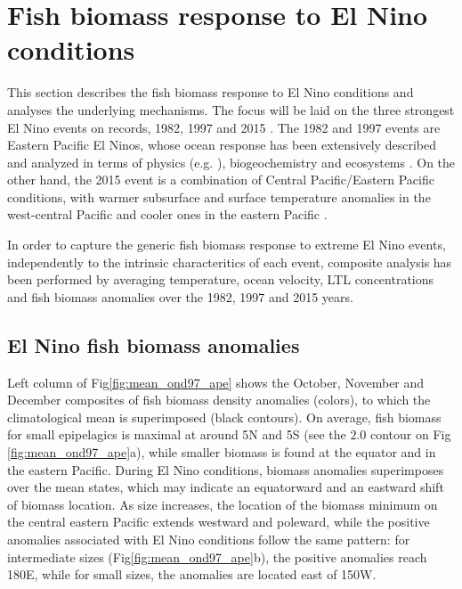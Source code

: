 \section{Fish biomass response to El Nino conditions}

This section describes the fish biomass response to El Nino conditions and analyses the underlying mechanisms. The focus will be laid on the three strongest El Nino events on records, 1982, 1997 and 2015 \citep{santosoDefiningCharacteristicsENSO2017}. The 1982 and 1997 events are Eastern Pacific El Ninos, whose ocean response has been extensively described and analyzed in terms of physics  (e.g. \citealt{mcphadenGenesisEvolution1997981999, vialardModelStudyOceanic2001, lengaigneOceanResponseMarch2002}), biogeochemistry \citep{chavezBiologicalChemicalResponse1999, gierachBiologicalResponse19972012} and ecosystems \citep{leaObservationsFishesAssociated2000, glynnCoralBleachingMortality2001,arcosJackMackerelFishery2001}. On the other hand, the 2015 event is a combination of Central Pacific/Eastern Pacific conditions, with warmer subsurface and surface temperature anomalies in the west-central Pacific and cooler ones in the eastern Pacific \citep{lheureuxObservingPredicting20152017}. 

In order to capture the generic fish biomass response to extreme El Nino events, independently to the intrinsic characteritics of each event, composite analysis has been performed by averaging temperature, ocean velocity, LTL concentrations and fish biomass anomalies over the 1982, 1997 and 2015 years.

\subsection{El Nino fish biomass anomalies}

Left column of Fig\ref{fig:mean_ond97_ape} shows the October, November and December composites of fish biomass density anomalies (colors), to which the climatological mean is superimposed (black contours). On average, fish biomass for small epipelagics is maximal at around 5\degree{}N and 5\degree{}S (see the $2.0$ contour on Fig \ref{fig:mean_ond97_ape}a), while smaller biomass is found at the equator and in the eastern Pacific. During El Nino conditions, biomass anomalies superimposes over the mean states, which may indicate an equatorward and an eastward shift of biomass location.
As size increases, the location of the biomass minimum on the central eastern Pacific extends westward and poleward, while the positive anomalies associated with El Nino conditions follow the same pattern: for intermediate sizes (Fig\ref{fig:mean_ond97_ape}b), the positive anomalies reach 180\degree{}E, while for small sizes, the anomalies are located east of 150\degree{}W. 

